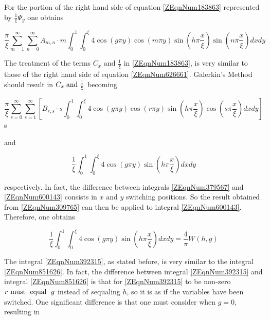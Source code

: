 \documentclass{article}
\newcommand{\spbox}[1]{ \text{ #1 }} %
\begin{document}
For the portion of the right hand side of equation \eqref{ZEqnNum183863}
represented by $\frac{1}{\xi } \Psi _{y} $ one obtains

\begin{equation} \label{ZEqnNum659914} \frac{\pi }{\xi } \sum _{m=1}^{\infty
} \sum _{n=0}^{\infty }A_{m,n} \cdot m\int _{0}^{1} \int _{0}^{\xi }4\cos
\left(g\pi y\right)\cos \left(m\pi y\right)\sin \left(h\pi \frac{x}{\xi }
\right)\sin \left(n\pi \frac{x}{\xi } \right) dxdy \end{equation}

The treatment of the terms $C_{x} \spbox{and} \frac{1}{\xi } $ in
\eqref{ZEqnNum183863}, is very similar to those of the right hand side of
equation \eqref{ZEqnNum626661}. Galerkin's Method should result in $C_{x} {\rm
\; and\; } \frac{1}{\xi } $ becoming

\begin{equation} \label{ZEqnNum392315} \frac{\pi }{\xi } \sum _{r=0}^{\infty
} \sum _{s=1}^{\infty } \left[B_{r,s} \cdot s\int _{0}^{1} \int _{0}^{\xi }4\cos
\left(g\pi y\right)\cos (r\pi y)\sin \left(h\pi \frac{x}{\xi } \right)\cos
\left(s\pi \frac{x}{\xi } \right)dxdy \right] \end{equation}s

and

\begin{equation} \label{ZEqnNum600143} \frac{1}{\xi } \int _{0}^{1} \int
_{0}^{\xi }4\cos \left(g\pi y\right)\sin \left(h\pi \frac{x}{\xi } \right)dxdy
\end{equation} 

respectively. In fact, the difference between integrals \eqref{ZEqnNum379567}
and \eqref{ZEqnNum600143} consists in $x\spbox{and}y$ switching positions.
So the result obtained from \eqref{ZEqnNum309765} can then be applied to
integral \eqref{ZEqnNum600143}. Therefore, one obtains

\begin{equation} \label{3.29)} \frac{1}{\xi } \int _{0}^{1} \int _{0}^{\xi }4\cos
\left(g\pi y\right)\sin \left(h\pi \frac{x}{\xi } \right)dxdy =\frac{4}{\pi }
W\left(h,g\right) \end{equation}

 The integral \eqref{ZEqnNum392315}, as stated before, is very similar to the
 integral \eqref{ZEqnNum851626}. In fact, the difference between integral
 \eqref{ZEqnNum392315} and integral \eqref{ZEqnNum851626} is that for
 \eqref{ZEqnNum392315} to be non-zero $r \text{ must\; equal\; } g$ instead of
 $s$equaling $h$, so it is as if the variables have been switched. One
 significant difference is that one must consider when $g=0$, resulting in
\end{document}
